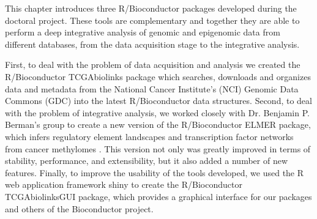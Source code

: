 
This chapter introduces three R/Bioconductor packages developed during the doctoral project. These tools are complementary and together they are able to perform a deep integrative analysis of genomic and epigenomic data from different databases, from the data acquisition stage to the integrative analysis.

First, to deal with the problem of data acquisition and analysis we created the   R/Bioconductor  TCGAbiolinks package which searches, downloads and organizes data and metadata from the National Cancer Institute's (NCI) Genomic Data Commons (GDC)
into the latest R/Bioconductor data structures. Second, to deal with the problem of integrative analysis, we worked closely with Dr. Benjamin P. Berman's group to create a new version of the R/Bioconductor ELMER package, which infers regulatory element landscapes and transcription factor networks from cancer methylomes \cite{yao2015inferring}. This version not only was greatly improved in terms of stability, performance, and extensibility, but it also added a number of new features.
Finally, to improve the usability of the tools developed, we used the R web application framework shiny \cite{shiny} to create the R/Bioconductor TCGAbiolinksGUI package, which provides a graphical interface
for our packages and others of the Bioconductor project.




